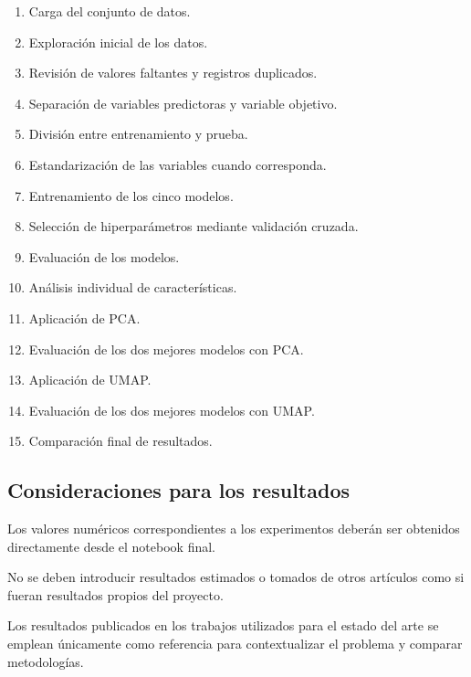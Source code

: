 \documentclass[conference]{IEEEtran}
\begin{document}
\begin{enumerate}

    \item Carga del conjunto de datos.

    \item Exploración inicial de los datos.

    \item Revisión de valores faltantes y registros duplicados.

    \item Separación de variables predictoras y variable objetivo.

    \item División entre entrenamiento y prueba.

    \item Estandarización de las variables cuando corresponda.

    \item Entrenamiento de los cinco modelos.

    \item Selección de hiperparámetros mediante validación cruzada.

    \item Evaluación de los modelos.

    \item Análisis individual de características.

    \item Aplicación de PCA.

    \item Evaluación de los dos mejores modelos con PCA.

    \item Aplicación de UMAP.

    \item Evaluación de los dos mejores modelos con UMAP.

    \item Comparación final de resultados.

\end{enumerate}


\subsection{Consideraciones para los resultados}

Los valores numéricos correspondientes a los experimentos deberán ser obtenidos directamente desde el notebook final.

No se deben introducir resultados estimados o tomados de otros artículos como si fueran resultados propios del proyecto.

Los resultados publicados en los trabajos utilizados para el estado del arte se emplean únicamente como referencia para contextualizar el problema y comparar metodologías.
\end{document}
